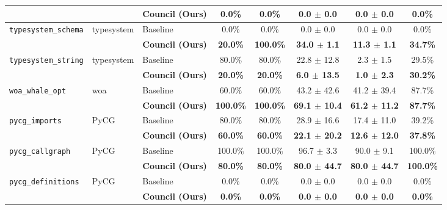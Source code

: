 \begin{table}[t]
\begin{tabular}{lll c c c c c}
 & & \textbf{Council (Ours)} & \textbf{0.0\%} & \textbf{0.0\%} & \textbf{0.0 $\pm$ 0.0} & \textbf{0.0 $\pm$ 0.0} & \textbf{0.0\%} \\
\midrule
\multirow{2}{*}{\texttt{typesystem_schema}} & \multirow{2}{*}{typesystem} & Baseline & 0.0\% & 0.0\% & 0.0 $\pm$ 0.0 & 0.0 $\pm$ 0.0 & 0.0\% \\
 & & \textbf{Council (Ours)} & \textbf{20.0\%} & \textbf{100.0\%} & \textbf{34.0 $\pm$ 1.1} & \textbf{11.3 $\pm$ 1.1} & \textbf{34.7\%} \\
\midrule
\multirow{2}{*}{\texttt{typesystem_string}} & \multirow{2}{*}{typesystem} & Baseline & 80.0\% & 80.0\% & 22.8 $\pm$ 12.8 & 2.3 $\pm$ 1.5 & 29.5\% \\
 & & \textbf{Council (Ours)} & \textbf{20.0\%} & \textbf{20.0\%} & \textbf{6.0 $\pm$ 13.5} & \textbf{1.0 $\pm$ 2.3} & \textbf{30.2\%} \\
\midrule
\multirow{2}{*}{\texttt{woa_whale_opt}} & \multirow{2}{*}{woa} & Baseline & 60.0\% & 60.0\% & 43.2 $\pm$ 42.6 & 41.2 $\pm$ 39.4 & 87.7\% \\
 & & \textbf{Council (Ours)} & \textbf{100.0\%} & \textbf{100.0\%} & \textbf{69.1 $\pm$ 10.4} & \textbf{61.2 $\pm$ 11.2} & \textbf{87.7\%} \\
\midrule
\multirow{2}{*}{\texttt{pycg_imports}} & \multirow{2}{*}{PyCG} & Baseline & 80.0\% & 80.0\% & 28.9 $\pm$ 16.6 & 17.4 $\pm$ 11.0 & 39.2\% \\
 & & \textbf{Council (Ours)} & \textbf{60.0\%} & \textbf{60.0\%} & \textbf{22.1 $\pm$ 20.2} & \textbf{12.6 $\pm$ 12.0} & \textbf{37.8\%} \\
\midrule
\multirow{2}{*}{\texttt{pycg_callgraph}} & \multirow{2}{*}{PyCG} & Baseline & 100.0\% & 100.0\% & 96.7 $\pm$ 3.3 & 90.0 $\pm$ 9.1 & 100.0\% \\
 & & \textbf{Council (Ours)} & \textbf{80.0\%} & \textbf{80.0\%} & \textbf{80.0 $\pm$ 44.7} & \textbf{80.0 $\pm$ 44.7} & \textbf{100.0\%} \\
\midrule
\multirow{2}{*}{\texttt{pycg_definitions}} & \multirow{2}{*}{PyCG} & Baseline & 0.0\% & 0.0\% & 0.0 $\pm$ 0.0 & 0.0 $\pm$ 0.0 & 0.0\% \\
 & & \textbf{Council (Ours)} & \textbf{0.0\%} & \textbf{0.0\%} & \textbf{0.0 $\pm$ 0.0} & \textbf{0.0 $\pm$ 0.0} & \textbf{0.0\%} \\
\midrule
\bottomrule
\end{tabular}
\end{table}
